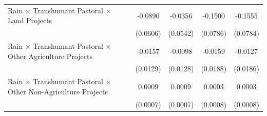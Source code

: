 {\begin{tabular}{l*{4}{c}}
\addlinespace
\hspace{15pt} Rain $\times$ Transhumant Pastoral $\times$ Land Projects&     -0.0890         &     -0.0356         &     -0.1500\sym{*}  &     -0.1555\sym{**} \\
                    &    (0.0606)         &    (0.0542)         &    (0.0786)         &    (0.0784)         \\
\addlinespace
\hspace{15pt} Rain $\times$ Transhumant Pastoral $\times$ Other Agriculture Projects&     -0.0157         &     -0.0098         &     -0.0159         &     -0.0127         \\
                    &    (0.0129)         &    (0.0128)         &    (0.0188)         &    (0.0186)         \\
\addlinespace
\hspace{15pt} Rain $\times$ Transhumant Pastoral $\times$ Other Non-Agriculture Projects&      0.0009         &      0.0009         &      0.0003         &      0.0003         \\
                    &    (0.0007)         &    (0.0007)         &    (0.0008)         &    (0.0008)         \\
\bottomrule
\end{tabular}
}

